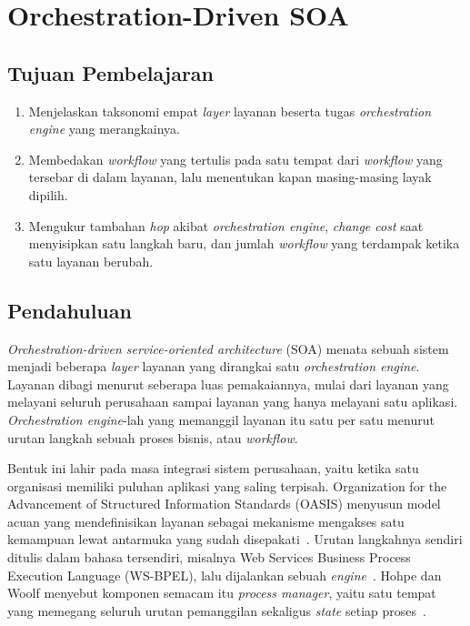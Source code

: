 \chapter{Orchestration-Driven SOA}
\label{bab:odsoa}

\section*{Tujuan Pembelajaran}

\begin{enumerate}
  \item Menjelaskan taksonomi empat \textit{layer} layanan beserta tugas
    \textit{orchestration engine} yang merangkainya.
  \item Membedakan \textit{workflow} yang tertulis pada satu tempat dari
    \textit{workflow} yang tersebar di dalam layanan, lalu menentukan kapan
    masing-masing layak dipilih.
  \item Mengukur tambahan \textit{hop} akibat \textit{orchestration engine},
    \textit{change cost} saat menyisipkan satu langkah baru, dan jumlah
    \textit{workflow} yang terdampak ketika satu layanan berubah.
\end{enumerate}

\section{Pendahuluan}

\textit{Orchestration-driven service-oriented architecture}%
(SOA) menata sebuah sistem menjadi beberapa
\textit{layer} layanan yang dirangkai satu
\textit{orchestration engine}.
Layanan dibagi menurut seberapa luas pemakaiannya, mulai dari layanan yang
melayani seluruh perusahaan sampai layanan yang hanya melayani satu aplikasi.
\textit{Orchestration engine}-lah yang memanggil layanan itu satu per satu
menurut urutan langkah sebuah proses bisnis, atau
\textit{workflow}.

Bentuk ini lahir pada masa integrasi sistem perusahaan, yaitu ketika satu
organisasi memiliki puluhan aplikasi yang saling terpisah. Organization for the
Advancement of Structured Information Standards (OASIS) menyusun model acuan
yang mendefinisikan layanan sebagai mekanisme mengakses satu kemampuan lewat
antarmuka yang sudah disepakati~\cite{oasis2006soarm}. Urutan langkahnya
sendiri ditulis dalam bahasa tersendiri, misalnya Web Services Business Process
Execution Language (WS-BPEL), lalu dijalankan sebuah
\textit{engine}~\cite{oasis2007wsbpel}. Hohpe dan Woolf menyebut komponen
semacam itu \textit{process manager}, yaitu satu tempat yang memegang seluruh
urutan pemanggilan sekaligus \textit{state} setiap proses~\cite{hohpe2003eip}.

